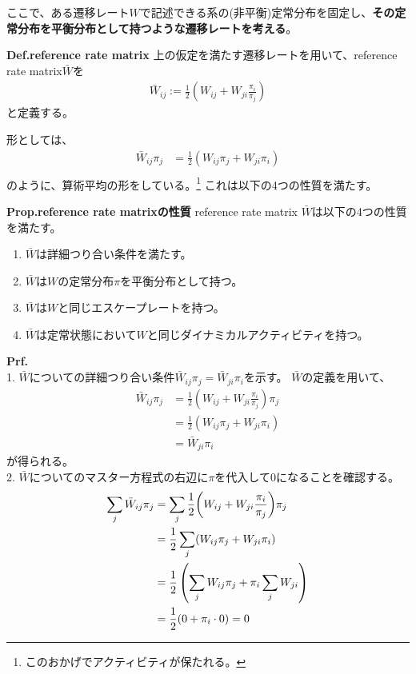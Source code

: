 \documentclass[a4paper,11pt]{jsarticle}
\numberwithin{equation}{section}
\begin{document}
ここで、ある遷移レート$W$で記述できる系の(非平衡)定常分布を固定し、\textbf{その定常分布を平衡分布として持つような遷移レートを考える}。
\begin{itembox}[l]{\textbf{Def.reference rate matrix}}
    上の仮定を満たす遷移レートを用いて、reference rate matrix$\bar{W}$を
    \begin{align}
        \bar{W}_{ij} := \frac{1}{2} \left(W_{ij} + W_{ji} \frac{\pi_i}{\pi_j}\right)
    \end{align}
    と定義する。
\end{itembox}
形としては、
\begin{align}
    \bar{W}_{ij}\pi_j &= \frac{1}{2} (W_{ij} \pi_j + W_{ji} \pi_i)\\
\end{align}
のように、算術平均の形をしている。\footnote{このおかげでアクティビティが保たれる。}
これは以下の4つの性質を満たす。
\begin{itembox}[l]{\textbf{Prop.reference rate matrixの性質}}
    reference rate matrix $\bar{W}$は以下の4つの性質を満たす。
\begin{enumerate}
    \item $\bar{W}$は詳細つり合い条件を満たす。
    \item $\bar{W}$は$W$の定常分布$\pi$を平衡分布として持つ。
    \item $\bar{W}$は$W$と同じエスケープレートを持つ。
    \item $\bar{W}$は定常状態において$W$と同じダイナミカルアクティビティを持つ。
\end{enumerate}
\end{itembox}
\textbf{Prf.}\\
1. 
$\bar{W}$についての詳細つり合い条件$\bar{W}_{ij} \pi_j = \bar{W}_{ji} \pi_i$を示す。
$\bar{W}$の定義を用いて、
\begin{align}
    \bar{W}_{ij} \pi_j &= \frac{1}{2} \left(W_{ij} + W_{ji} \frac{\pi_i}{\pi_j}\right) \pi_j\\
    &= \frac{1}{2} (W_{ij} \pi_j + W_{ji} \pi_i)\\
    &= \bar{W}_{ji} \pi_i
\end{align}
が得られる。\\
2.
$\bar{W}$についてのマスター方程式の右辺に$\pi$を代入して$0$になることを確認する。
\begin{align}
    \sum_j \bar{W}_{ij} \pi_j
    &= \sum_j \frac{1}{2} \qty(W_{ij} + W_{ji} \frac{\pi_i}{\pi_j}) \pi_j\\
    &= \frac{1}{2} \sum_j (W_{ij} \pi_j + W_{ji} \pi_i)\\
    &= \frac{1}{2} \left(\sum_j W_{ij} \pi_j + \pi_i \sum_j W_{ji}\right)\\
    &= \frac{1}{2} (0 + \pi_i \cdot 0) = 0
\end{align}
\end{document}
